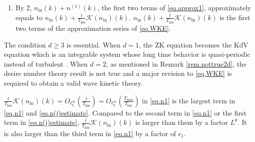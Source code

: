 \begin{thm}
\begin{enumerate}
\begin{equation}
\begin{aligned}
            && \text{if } |k|\le \epsilon_1 l_{d}^{-1},
            \\
            &0, && \text{if } |k|\ge 2C_{2}  l_{d}^{-1}
        \end{aligned}\right.
    \end{equation}%
    and 
    \begin{equation}\label{eq.n(j)estimate}
        n^{(j)}(k)=O_{\ell^\infty_k}\left(L^{-\theta}\frac{t}{T_{\mathrm {kin}}}\right), \qquad j>1
    \end{equation}
    where $\mathcal K$ is defined in \eqref{eq.WKE}, and $O_{\ell^\infty_k}(A)$ (resp. $\widetilde{O}_{\ell^\infty_k}(A)$) is a quantity that is bounded by $A$ in $\ell^\infty_k$ by some universal constant (resp. constant just depending on $d$). The definition of universal constant can be found in section \ref{sec.notat}. The definition of $\text{Err}_D$ is 
    \begin{equation}
        \text{Err}_{D}(k_x)=\left\{\begin{aligned}
             &D^{d+1}, && \text{if } |k_x|\le D,
            \\
            &D^{d-1}(|k_x|^2+D|k_x|), && \text{if } |k_x|\ge D.
        \end{aligned}
        \right.
    \end{equation}
    \item By 2, $n_{\mathrm{in}}(k)+n^{(1)}(k)$, the first two terms of \eqref{eq.approx1}, approximately equals to $n_{\mathrm{in}}(k)+\frac{t}{T_{\mathrm{kin}}}\mathcal K(n_{\mathrm{in}})(k)$. $n_{\mathrm{in}}(k)+\frac{t}{T_{\mathrm{kin}}}\mathcal K(n_{\mathrm{in}})(k)$ is the first two terms of the approximation series of \eqref{eq.WKE}.
\end{enumerate}


\end{thm}

\begin{rem}
The condition $d\ge 3$ is essential. When $d=1$, the ZK equation becomes the KdV equation which is an integrable system whose long time behavior is quasi-periodic instead of turbulent \cite{}. When $d=2$, as mentioned in Remark \ref{rem.nottrue2d}, the desire number theory result is not true and a major revision to \eqref{eq.WKE} is required to obtain a valid wave kinetic theory.
\end{rem}

\begin{rem}
$\frac{t}{T_{\mathrm{kin}}}\mathcal K(n_{\mathrm{in}})(k)=O_{\ell^\infty_k}\left(\frac{t}{T_{\mathrm{kin}}}\right)=O_{\ell^\infty_k}\left(\frac{T_{\mathrm{max}}}{T_{\mathrm{kin}}}\right)$ in \eqref{eq.n1} is the largest term in \eqref{eq.n1} and \eqref{eq.n(j)estimate}. Compared to the second term in \eqref{eq.n1} or the first term in \eqref{eq.n(j)estimate}, $\frac{t}{T_{\mathrm{kin}}}\mathcal K(n_{\mathrm{in}})(k)$ is larger than them by a factor $L^{\theta}$.  It is also larger than the third term in \eqref{eq.n1} by a factor of $\epsilon_1$.
\end{rem}

